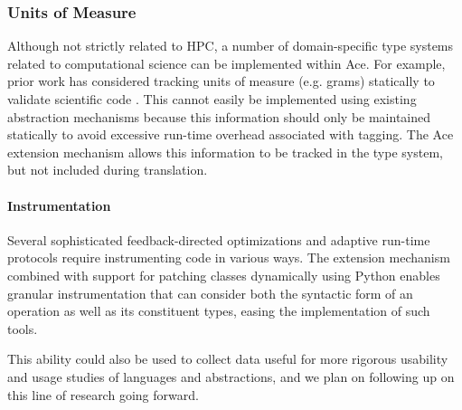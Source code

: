 \documentclass[9pt,preprint]{sigplanconf}
\begin{document}
\subsubsection{Units of Measure}
Although not strictly related to HPC, a number of domain-specific type systems related to computational science can be implemented within Ace. For example, prior work has considered tracking units of measure (e.g. grams) statically to validate scientific code \cite{conf/cefp/Kennedy09}. This cannot easily be implemented using existing abstraction mechanisms because this information should only be maintained statically to avoid excessive run-time overhead associated with tagging. The Ace extension mechanism allows this information to be tracked in the type system, but not included during translation.


\paragraph{Instrumentation}
Several sophisticated feedback-directed optimizations and adaptive run-time protocols require instrumenting code in various ways. The extension mechanism combined with support for patching classes dynamically using Python enables granular instrumentation that can consider both the syntactic form of an operation as well as its constituent types, easing the implementation of such tools.

This ability could also be used to collect data useful for more rigorous usability and usage studies of languages and abstractions, and we plan on following up on this line of research going forward.
\end{document}
